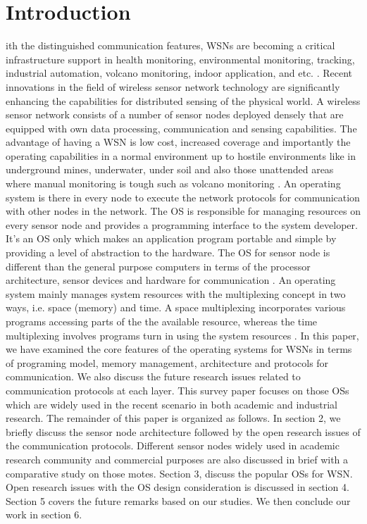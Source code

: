 \documentclass[12pt,journal,communications surveys and tutorials]{IEEEtran}
\begin{document}
\IEEEpeerreviewmaketitle



\section{Introduction}




ith the distinguished communication features, WSNs are becoming a critical infrastructure support in health monitoring, environmental monitoring, tracking, industrial automation, volcano monitoring, indoor application, and etc. \cite{Akyildiz2002,chehri2010experimental,misra2010safety,1607983,yick2008wireless}.
Recent innovations in the field of wireless sensor network technology are significantly enhancing the capabilities for distributed sensing of the physical world. A wireless sensor network consists of a number of sensor nodes deployed densely that are equipped with own data processing, communication and sensing capabilities. The advantage of having a WSN is low cost, increased coverage and importantly the operating capabilities in a normal environment up to hostile environments like in underground mines, underwater, under soil and also those unattended areas where manual monitoring is tough such as volcano monitoring \cite{misra2010safety,1607983,yick2008wireless,ranjan2014advancements}.
An operating system is there in every node to execute the network protocols for communication with other nodes in the network. The OS is responsible for managing resources on every sensor node and provides a programming interface to the system developer. It's an OS only which makes an application program portable and simple by providing a level of abstraction to the hardware. The OS for sensor node is different than the general purpose computers in terms of the processor architecture, sensor devices and hardware for communication \cite{dutta2012operating}. An operating system mainly manages system resources with the multiplexing concept in two ways, i.e. space (memory) and time. A space multiplexing incorporates various programs accessing parts of the the available resource, whereas the time multiplexing involves programs turn in using the system resources \cite{phani2007operating}. In this paper, we have examined the core features of the operating systems for WSNs in terms of programing model, memory management, architecture and protocols for communication. We also discuss the future research issues related to communication protocols at each layer. This survey paper focuses on those OSs which are widely used in the recent scenario in both academic and industrial research. The remainder of this paper is organized as follows. In section 2, we briefly discuss the sensor node architecture followed by the open research issues of the communication protocols. Different sensor nodes widely used in academic research community and commercial purposes are also discussed in brief with a comparative  study on those motes. Section 3, discuss the popular OSs for WSN. Open research issues with the OS design consideration is discussed in section 4. Section 5 covers the future remarks based on our studies. We then conclude our work in section 6. 
 
\end{document}
